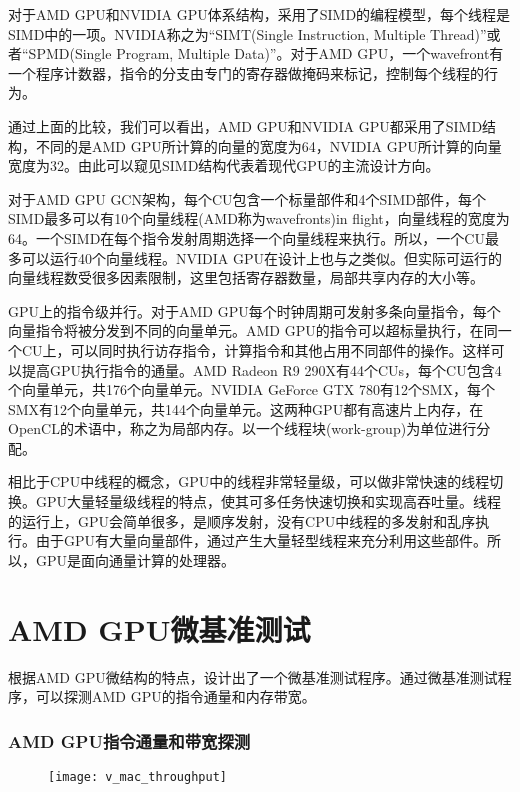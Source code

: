 对于AMD GPU和NVIDIA GPU体系结构，采用了SIMD的编程模型，每个线程是SIMD中的一项。NVIDIA称之为“SIMT(Single Instruction, Multiple Thread)”或者“SPMD(Single Program, Multiple Data)”。对于AMD GPU，一个wavefront有一个程序计数器，指令的分支由专门的寄存器做掩码来标记，控制每个线程的行为。

通过上面的比较，我们可以看出，AMD GPU和NVIDIA GPU都采用了SIMD结构，不同的是AMD GPU所计算的向量的宽度为64，NVIDIA GPU所计算的向量宽度为32。由此可以窥见SIMD结构代表着现代GPU的主流设计方向。

对于AMD GPU GCN架构，每个CU包含一个标量部件和4个SIMD部件，每个SIMD最多可以有10个向量线程(AMD称为wavefronts)in flight，向量线程的宽度为64。一个SIMD在每个指令发射周期选择一个向量线程来执行。所以，一个CU最多可以运行40个向量线程。NVIDIA GPU在设计上也与之类似。但实际可运行的向量线程数受很多因素限制，这里包括寄存器数量，局部共享内存的大小等。

GPU上的指令级并行。对于AMD GPU每个时钟周期可发射多条向量指令，每个向量指令将被分发到不同的向量单元。AMD GPU的指令可以超标量执行，在同一个CU上，可以同时执行访存指令，计算指令和其他占用不同部件的操作。这样可以提高GPU执行指令的通量。AMD Radeon R9 290X有44个CUs，每个CU包含4个向量单元，共176个向量单元。NVIDIA GeForce GTX 780有12个SMX，每个SMX有12个向量单元，共144个向量单元。这两种GPU都有高速片上内存，在OpenCL的术语中，称之为局部内存。以一个线程块(work-group)为单位进行分配。

相比于CPU中线程的概念，GPU中的线程非常轻量级，可以做非常快速的线程切换。GPU大量轻量级线程的特点，使其可多任务快速切换和实现高吞吐量。线程的运行上，GPU会简单很多，是顺序发射，没有CPU中线程的多发射和乱序执行。由于GPU有大量向量部件，通过产生大量轻型线程来充分利用这些部件。所以，GPU是面向通量计算的处理器。


\section{AMD GPU微基准测试}
根据AMD GPU微结构的特点，设计出了一个微基准测试程序。通过微基准测试程序，可以探测AMD GPU的指令通量和内存带宽。


\subsubsection{AMD GPU指令通量和带宽探测}
\begin{figure}[htbp]
	\centering
	\texttt{[image: v\_mac\_throughput]}
	\label{fig:v_mac_throughput}
\end{figure}

